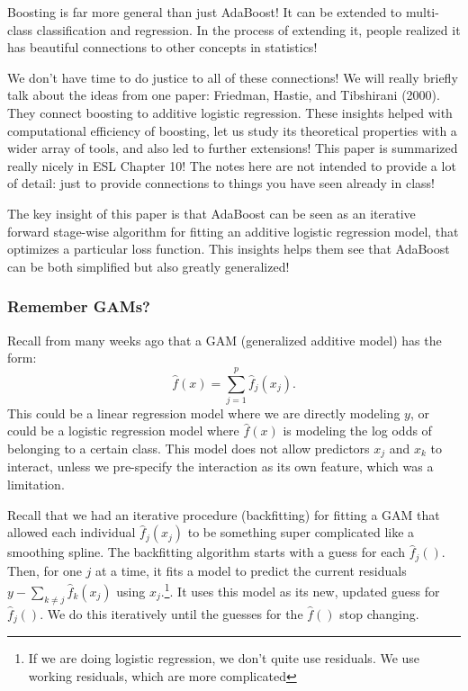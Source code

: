 Boosting is far more general than just AdaBoost! It can be extended to multi-class classification and regression. In the process of extending it, people realized it has beautiful connections to other concepts in statistics! %

We don't have time to do justice to all of these connections! We will really briefly talk about the ideas from one paper: Friedman, Hastie, and Tibshirani  (2000). They connect boosting to additive logistic regression. These insights helped with computational efficiency of boosting, let us study its theoretical properties with a wider array of tools, and also led to further extensions! This paper is summarized really nicely in ESL Chapter 10! The notes here are not intended to provide a lot of detail: just to provide connections to things you have seen already in class!

The key insight of this paper is that AdaBoost can be seen as an iterative forward stage-wise algorithm for fitting an additive logistic regression model, that optimizes a particular loss function. This insights helps them see that AdaBoost can be both simplified but also greatly generalized! 

\subsubsection{Remember GAMs?}

Recall from many weeks ago that a GAM (generalized additive model) has the form: 
$$
\hat{f}(x) = \sum_{j=1}^p \hat{f}_j(x_j).
$$
This could be a linear regression model where we are directly modeling $y$, or could be a logistic regression model where $\hat{f}(x)$ is modeling the log odds of belonging to a certain class.  This model does not allow predictors $x_j$ and $x_k$ to interact, unless we pre-specify the interaction as its own feature, which was a limitation.

Recall that we had an iterative procedure (backfitting) for fitting a GAM that allowed each individual $\hat{f}_j(x_j)$ to be something super complicated like a smoothing spline. The backfitting algorithm starts with a guess for each $\hat{f}_j()$. Then, for one $j$ at a time, it fits a model to predict the current residuals $y - \sum_{k \neq j} \hat{f}_k(x_j)$ using $x_j$.\footnote{If we are doing logistic regression, we don't quite use residuals. We use working residuals, which are more complicated}. It uses this model as its new, updated guess for $\hat{f}_j()$. We do this iteratively until the guesses for the $\hat{f}()$ stop changing. 

